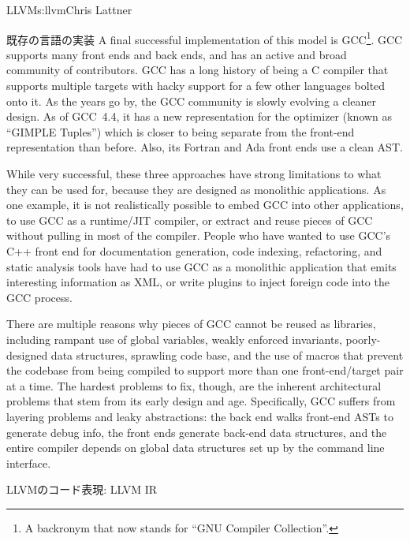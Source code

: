 \begin{aosachapter}{LLVM}{s:llvm}{Chris Lattner}
\begin{aosasect1}{既存の言語の実装}
A final successful implementation of this model is GCC\footnote{A
backronym that now stands for ``GNU Compiler Collection''.}.  GCC
supports many front ends and back ends, and has an active and broad
community of contributors.  GCC has a long history of being a C
compiler that supports multiple targets with hacky support for a few
other languages bolted onto it.  As the years go by, the GCC community
is slowly evolving a cleaner design.  As of GCC~4.4, it has a new
representation for the optimizer (known as ``GIMPLE Tuples'') which is
closer to being separate from the front-end representation than
before.  Also, its Fortran and Ada front ends use a clean AST.

While very successful, these three approaches have strong limitations
to what they can be used for, because they are designed as monolithic
applications.  As one example, it is not realistically possible to
embed GCC into other applications, to use GCC as a runtime/JIT
compiler, or extract and reuse pieces of GCC without pulling in most
of the compiler.  People who have wanted to use GCC's C++ front end for
documentation generation, code indexing, refactoring, and static
analysis tools have had to use GCC as a monolithic application that
emits interesting information as XML, or write plugins to inject
foreign code into the GCC process.

There are multiple reasons why pieces of GCC cannot be reused as
libraries, including rampant use of global variables, weakly enforced
invariants, poorly-designed data structures, sprawling code base, and
the use of macros that prevent the codebase from being compiled to
support more than one front-end/target pair at a time.  The hardest
problems to fix, though, are the inherent architectural problems that
stem from its early design and age.  Specifically, GCC suffers from
layering problems and leaky abstractions: the back end walks front-end
ASTs to generate debug info, the front ends generate back-end data
structures, and the entire compiler depends on global data structures
set up by the command line interface.

\end{aosasect1}

\begin{aosasect1}{LLVMのコード表現: LLVM IR}


\end{aosasect1}
\end{aosachapter}
